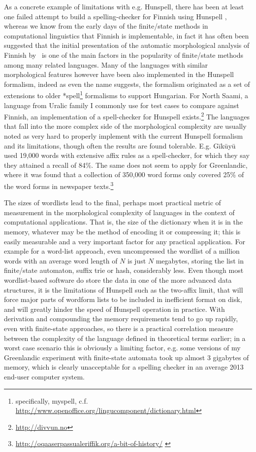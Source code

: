 \documentclass[officiallayout,final]{unihelcompling}
\begin{document}
As a concrete example of limitations with e.g. Hunspell, there has been at
least one failed attempt to build a spelling-checker for Finnish using Hunspell
\citep{pitkanen2006hunspell}, whereas we know from the early days of the
finite\-/state methods in computational linguistics that Finnish is
implementable, in fact it has often been suggested that the initial
presentation of the automatic morphological analysis of Finnish
by~\citet{koskenniemi1983twolevel} is one of the main factors in the popularity
of finite\-/state methods among many related languages. Many of the languages
with similar morphological features however have been also implemented in the
Hunspell \gls{formalism}, indeed as even the name suggests, the formalism
originated as a set of extensions to older *spell\footnote{specifically,
myspell, c.f.  \url{http://www.openoffice.org/lingucomponent/dictionary.html}}
formalisms to support Hungarian.  For North Saami,  a language from Uralic
family I commonly use for test cases to compare against Finnish, an
implementation of a spell-checker for Hunspell
exists.\footnote{\url{http://divvun.no}} The languages that fall into the more
complex side of the morphological complexity are usually noted as very hard to
properly implement with the current Hunspell formalism and its limitations,
though often the results are found tolerable.  E.g.
Gīkūyū~\citet{chege2010developing} used 19,000 words with extensive affix rules
as a spell-checker, for which they say they attained a recall of 84\%.  The
same does not seem to apply for Greenlandic, where it was found that a
collection of 350,000 word forms only covered 25\% of the word forms in
newspaper
texts.\footnote{\url{http://oqaaserpassualeriffik.org/a-bit-of-history/}
\label{footnote:greenlandic}}

The sizes of wordlists lead to the final, perhaps most practical metric of
measurement in the morphological complexity of languages in the context of
computational applications. That is, the size of the dictionary when it is in
the memory, whatever may be the method of encoding it or compressing it; this
is easily measurable and a very important factor for any practical application.
For example for a word-list approach, even uncompressed the wordlist of a
million words with an average word length of $N$ is just $N$ megabytes, storing
the list in finite\-/state automaton, suffix trie or hash, considerably less.
Even though most wordlist-based software do store the data in one of the more
advanced data structures, it is the limitations of Hunspell such as the
two-affix limit, that will force major parts of wordform lists to be included
in inefficient format on disk, and will greatly hinder the speed of Hunspell
operation in practice. With derivation and compounding the memory requirements
tend to go up rapidly, even with finite-state approaches, so there is a
practical correlation measure between the complexity of the language defined in
theoretical terms earlier; in a worst case scenario this is obviously a
limiting factor, e.g. some versions of my Greenlandic experiment with
finite-state automata took up almost 3 gigabytes of memory, which is clearly
unacceptable for a spelling checker in an average 2013 end-user computer
system.
\end{document}
